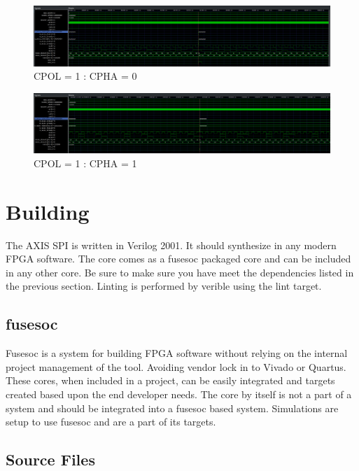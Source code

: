 \begin{figure}[H]
\caption{CPOL = 1 : CPHA = 0}
\centering
\includegraphics[width=\textwidth]{img/diagrams/waveform_10_spaced.png}
\end{figure}

\begin{figure}[H]
\caption{CPOL = 1 : CPHA = 1}
\centering
\includegraphics[width=\textwidth]{img/diagrams/waveform_11_spaced.png}
\end{figure}

\section{Building}

\par
The AXIS SPI is written in Verilog 2001. It should synthesize in any modern FPGA software. The core comes as a fusesoc packaged core and can be included in any other core. Be sure to make sure you have meet the dependencies listed in the previous section. Linting is performed by verible using the lint target.

\subsection{fusesoc}
\par
Fusesoc is a system for building FPGA software without relying on the internal project management of the tool. Avoiding vendor lock in to Vivado or Quartus.
These cores, when included in a project, can be easily integrated and targets created based upon the end developer needs. The core by itself is not a part of
a system and should be integrated into a fusesoc based system. Simulations are setup to use fusesoc and are a part of its targets.

\subsection{Source Files}

